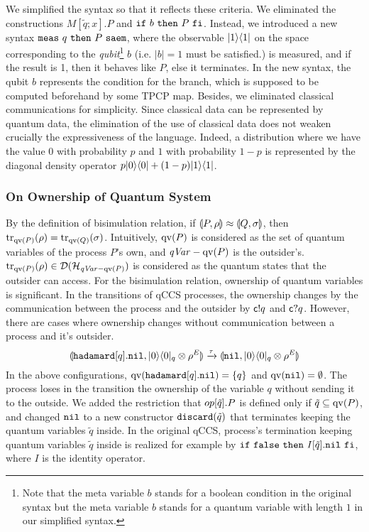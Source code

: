 We simplified the syntax so that
it reflects these criteria.
We eliminated the constructions $M[\tilde q;x].P$ and 
$\mathtt{if}~b~\mathtt{then}~P~\mathtt{fi}$.
Instead, we introduced a new syntax ${\tt meas}~q~{\tt then}~P~{\tt saem}$, where the
observable $|1\rangle\langle 1|$ on the space corresponding to the 
\emph{qubit}\footnote{Note that the meta variable $b$ stands for a boolean
condition in the original syntax but
the meta variable $b$ stands for a quantum variable with length $1$ in
our simplified syntax.}
 $b$ (i.e. $|b|=1$ must be satisfied.) is measured, and if the
result is 1, then it behaves like $P$, else it terminates.
In the new syntax, the qubit $b$ represents the condition for the branch,
which
is supposed to be computed beforehand by some TPCP map. %
Besides, we eliminated classical communications for simplicity.
Since classical data can be represented by quantum data,
the elimination of the use of classical data
does not weaken crucially the expressiveness of the language.
Indeed, a distribution where we have the value $0$ with probability $p$
and $1$ with probability $1-p$ is represented by the diagonal 
density operator $p|0\rangle\langle 0| + (1-p)|1\rangle\langle 1|$.

\subsubsection{On Ownership of Quantum System}
By the definition of bisimulation relation, 
if $\llparenthesis P, \rho \rrparenthesis \approx \llparenthesis Q, \sigma \rrparenthesis$, then
${\rm tr}_{\mathrm{qv}(P)}(\rho)={\rm tr}_{\mathrm{qv}(Q)}(\sigma)$. 
Intuitively, $\mathrm{qv}(P)$ is considered as the set of quantum variables of
the process
$P$'s own, and $\mathit{qVar} - \mathrm{qv}(P)$ is the outsider's. 
${\rm tr}_{\mathrm{qv}(P)}(\rho) \in \mathcal{D}(\mathcal{H}_{\mathit{qVar} - \mathrm{qv}(P)})$ is considered as the 
quantum states that the outsider can access. For the bisimulation
relation, ownership of quantum variables is significant. In
the transitions of qCCS processes, the ownership changes by
the communication between the process and the outsider by $\mathsf{c}! q$
and
$\mathsf{c}? q$. However, there are cases where ownership changes
without communication between a process and it's outsider.
\[
 \llparenthesis \mathtt{hadamard}[q].\mathtt{nil}, |0\rangle\langle 0|_{q}
 \otimes \rho^E \rrparenthesis \xrightarrow{\tau}
 \llparenthesis \mathtt{nil}, |0\rangle\langle 0|_{q}
 \otimes \rho^E \rrparenthesis 
\]
In the above configurations, $\mathrm{qv}(\mathtt{hadamard}[q].\mathtt{nil}) = \{q\}$ and
$\mathrm{qv}(\mathtt{nil}) = \emptyset$. The process loses in the 
transition the ownership of the variable
$q$ without sending it to the outside. We added the restriction
that $op[\tilde q].P$ is defined only if $\tilde q \subseteq
\mathrm{qv}(P)$, and changed $\mathtt{nil}$ to a new constructor $\mathtt{discard(} \tilde q \mathtt{)}$
that terminates keeping the quantum variables $\tilde q$ inside.
In the original qCCS, process's termination keeping 
quantum variables $\tilde q$ inside is realized for example by
$\mathtt{if}~\mathtt{false}~\mathtt{then}~\mathit{I}[\tilde
q].\mathtt{nil}~\mathtt{fi}$, where $\mathit{I}$ is the identity operator.

